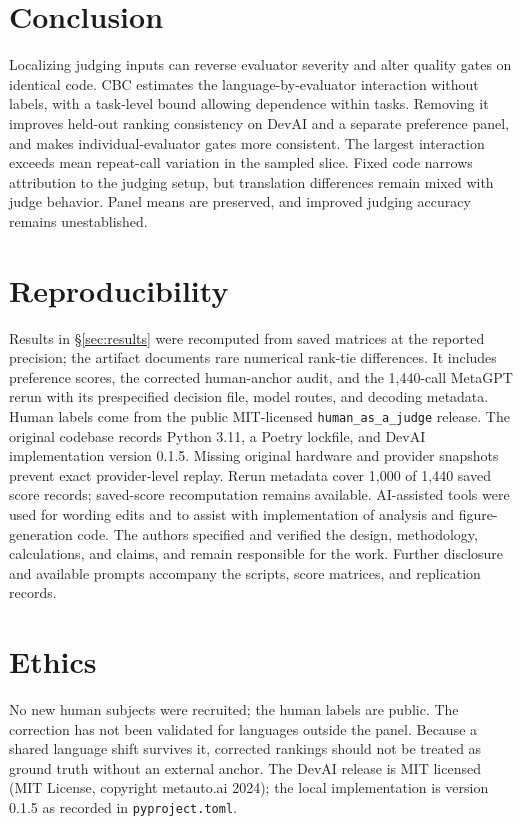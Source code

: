\documentclass[sigconf,anonymous]{aamas}
\begin{document}
\section*{Conclusion}

Localizing judging inputs can reverse evaluator severity and alter quality
gates on identical code. CBC estimates the language-by-evaluator
interaction without labels, with a task-level bound allowing dependence
within tasks. Removing it improves held-out ranking consistency on DevAI
and a separate preference panel, and makes individual-evaluator gates more
consistent. The largest interaction exceeds mean repeat-call variation
in the sampled slice. Fixed code narrows attribution to the judging setup,
but translation differences remain mixed with judge behavior. Panel means
are preserved, and improved judging accuracy remains unestablished.

\section*{Reproducibility}
Results in \S\ref{sec:results} were recomputed from saved matrices at the
reported precision; the artifact documents rare numerical rank-tie
differences. It includes preference scores, the corrected human-anchor
audit, and the 1{,}440-call MetaGPT rerun with its prespecified decision
file, model routes, and decoding metadata. Human labels come from the
public MIT-licensed \texttt{human\_as\_a\_judge} release. The original
codebase records Python 3.11, a Poetry lockfile, and DevAI implementation
version 0.1.5. Missing original hardware and provider snapshots prevent
exact provider-level replay. Rerun metadata cover 1{,}000 of 1{,}440 saved
score records; saved-score recomputation remains available.
AI-assisted tools were used for wording edits and to assist with
implementation of analysis and figure-generation code. The authors
specified and verified the design, methodology, calculations, and claims,
and remain responsible for the work. Further disclosure and available
prompts accompany the scripts, score matrices, and replication records.

\section*{Ethics}
No new human subjects were recruited; the human labels are public. The
correction has not been validated for languages outside the panel.
Because a shared
language shift survives it, corrected rankings should not be treated as ground
truth without an external anchor.
The DevAI release is MIT licensed (MIT License, copyright metauto.ai 2024);
the local implementation is version 0.1.5 as recorded in
\texttt{pyproject.toml}.



\end{document}
